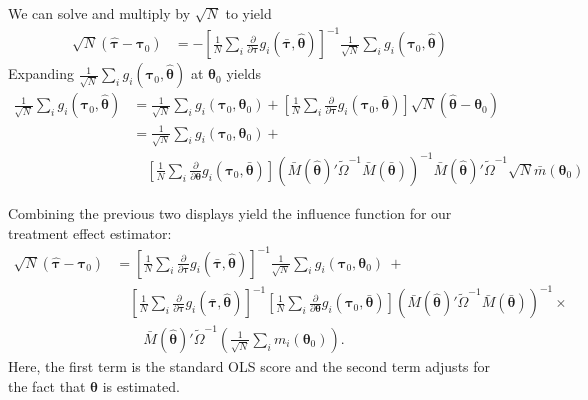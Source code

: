 \documentclass[12pt]{article}
\begin{document}
We can solve and multiply by $\sqrt{N}$ to yield
\begin{align*}
  \sqrt{N}(\hat{\bm{\tau}} - \bm{\tau}_0) &=
  - \left[ \frac{1}{N} \sum_i \frac{\partial}{\partial \bm{\tau}} g_i(\bar{\bm{\tau}}, \hat{\bm{\theta}}) \right]^{-1} \frac{1}{\sqrt{N}} \sum_i g_i(\bm{\tau}_0, \hat{\bm{\theta}})
\end{align*}
Expanding $\frac{1}{\sqrt{N}} \sum_i g_i(\bm{\tau}_0, \hat{\bm{\theta}})$ at $\bm{\theta}_0$ yields
\begin{align*}
  \frac{1}{\sqrt{N}} \sum_i g_i(\bm{\tau}_0, \hat{\bm{\theta}}) &= 
  \frac{1}{\sqrt{N}} \sum_i g_i(\bm{\tau}_0, \bm{\theta}_0) +
  \left[ \frac{1}{N} \sum_i \frac{\partial}{\partial \bm{\tau}} g_i(\bm{\tau}_0, \bar{\bm{\theta}}) \right] \sqrt{N} (\hat{\bm{\theta}} - \bm{\theta}_0) \\
  &= \frac{1}{\sqrt{N}} \sum_i g_i(\bm{\tau}_0, \bm{\theta}_0) + \\
  &\quad \left[ \frac{1}{N} \sum_i \frac{\partial}{\partial \bm{\theta}} g_i(\bm{\tau}_0, \bar{\bm{\theta}}) \right] \left( \bar{M}(\hat{\bm{\theta}})' \tilde{\Omega}^{-1} \bar{M}(\bar{\bm{\theta}}) \right)^{-1} \bar{M}(\hat{\bm{\theta}})' \tilde{\Omega}^{-1} \sqrt{N} \bar{m}(\bm{\theta}_0) 
\end{align*}

Combining the previous two displays yield the influence function for our treatment effect estimator:
\begin{align*}
  \sqrt{N}(\hat{\bm{\tau}} - \bm{\tau}_0) &=
  \left[ \frac{1}{N} \sum_i \frac{\partial}{\partial \bm{\tau}} g_i(\bar{\bm{\tau}}, \hat{\bm{\theta}}) \right]^{-1} 
  \frac{1}{\sqrt{N}} \sum_i g_i(\bm{\tau}_0, \bm{\theta}_0) \ + \\
  &\quad
  \left[ \frac{1}{N} \sum_i \frac{\partial}{\partial \bm{\tau}} g_i(\bar{\bm{\tau}}, \hat{\bm{\theta}}) \right]^{-1}
  \left[ \frac{1}{N} \sum_i \frac{\partial}{\partial \bm{\theta}} g_i(\bm{\tau}_0, \bar{\bm{\theta}}) \right] 
  \left( \bar{M}(\hat{\bm{\theta}})' \tilde{\Omega}^{-1} \bar{M}(\bar{\bm{\theta}}) \right)^{-1} \times \\
  &\qquad \bar{M}(\hat{\bm{\theta}})' \tilde{\Omega}^{-1} \left( 
    \frac{1}{\sqrt{N}} \sum_i m_i(\bm{\theta}_0)
  \right).
\end{align*}
Here, the first term is the standard OLS score and the second term adjusts for the fact that $\bm{\theta}$ is estimated.
\end{document}
